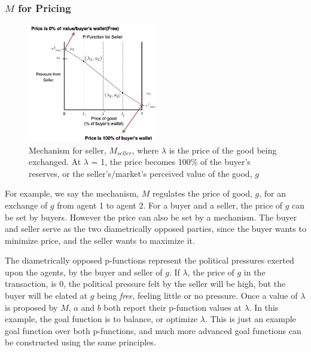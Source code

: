 \documentclass[10pt, titlepage, twocolumn]{report}
\begin{document}
\subsubsection{\(M\) for Pricing}
\begin{figure}[ht]
\centering
	\includegraphics[width=0.5\textwidth]{mechanisms_seller}
	\caption{Mechanism for seller, \(M_{seller}\), where \(\lambda\) is the price of the good being exchanged. At \(\lambda\) = 1, the price becomes 100\% of the buyer's reserves, or the seller's/market's perceived value of the good, \(g\)}
	\label{mechanisms_seller}
\end{figure}

\hspace*{15pt}
For example, we say the mechanism, \(M\) regulates the price of good, \(g\), for an exchange of \(g\) from agent 1 to agent 2.    For a buyer and a seller, the price of \(g\) can be set by buyers. However the price can also be set by a mechanism. The buyer and seller serve as the two diametrically opposed parties, since the buyer wants to minimize price, and the seller wants to maximize it. 

\hspace*{15pt}
The diametrically opposed p-functions represent the political pressures exerted upon the agents, by the buyer and seller of \(g\). If \(\lambda\), the price of \(g\) in the transaction, is 0, the political pressure felt by the seller will be high, but the buyer will be elated at \(g\) being \textit{free}, feeling little or no pressure. Once a value of \(\lambda\) is proposed by \(M\), \(a\) and \(b\) both report their p-function values at \(\lambda\). In this example, the goal function is to balance, or optimize \(\lambda\). This is just an example goal function over both p-functions, and much more advanced goal functions can be constructed using the same principles.
\end{document}

